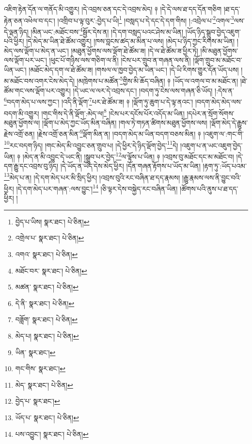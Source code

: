 འཇིག་རྟེན་དོན་ལ་གནོད་མི་འགྱུར། །དེ་འབྲས་ཅན་དང་དེ་འབྲས་མེད། ༈ །དེ་དེ་ལས་ཐ་དད་དོན་གཅིག །ཐ་དད་རྟེན་ཅན་འཕེལ་བ་དང་། །འགྲིབ་པ་ལྟ་བུར་:བྱེད་པ་ཡི།\footnote{བྱེད་པ་ཡིས།  སྣར་ཐང་།  པེ་ཅིན། } །བསླད་པ་དེ་དང་དེ་དག་གིས། །:འབྲེལ་པ་\footnote{འགྲེལ་པ་  སྣར་ཐང་།  པེ་ཅིན། }འགལ་\footnote{འགའ་  སྣར་ཐང་།  པེ་ཅིན། }ལས་དེ་ལྡན་ཉིད། །མིན་ཡང་:མཐོང་བས་\footnote{མཐོང་བར་  སྣར་ཐང་།  པེ་ཅིན། }སྦྱོར་དེས་ན། །དེ་དག་བསླད་པའང་ཤེས་མ་ཡིན། །ཡོད་ཉིད་སྒྲུབ་བྱེད་འཇུག་པའི་ཕྱིར། །དེ་མེད་མ་ཡིན་ཐེ་ཚོམ་འགྱུར། །ཁས་བླངས་ཚད་མ་མིན་པ་ལས། །མེད་པ་ཉིད་ཀྱང་རིགས་མ་ཡིན། །མེད་ལས་ལྡོག་པ་མེད་ན་ཡང་། །མཐུན་ཕྱོགས་ལས་ལྡོག་ཐེ་ཚོམ་ཟ། །དེ་ལ་ཐེ་ཚོམ་ཟ་ཕྱིར་ཏེ། །མི་མཐུན་ཕྱོགས་ལས་ལྡོག་པར་ཡང་། །ཕུང་པོ་གཉིས་ལས་གཅིག་ལ་ནི། །ངེས་པར་གྲུབ་ན་གཞན་ལས་ནི། །ལྡོག་གྲུབ་མ་མཐོང་བ་ཡིན་ཡང་། །མཐོང་མེད་དག་ལ་ཐེ་ཚོམ་ཟ། །གསལ་ལ་ཁྱབ་བྱེད་མ་ཡིན་ཡང་། །དེ་ཡི་རིགས་གྱུར་དོན་ཡོད་པས། །མ་མཐོང་བས་འགར་ངེས་མེད་དེ། །མཁྲེགས་པ་མཚོན་\footnote{མཚན་  སྣར་ཐང་།  པེ་ཅིན། }གྱིས་མི་ཆོད་བཞིན། ༈ །ཡོད་ལ་འགལ་བ་མ་མཐོང་ན། །ཐེ་ཚོམ་གང་ལས་ལྡོག་པར་འགྱུར། །དེ་ཡང་ལ་ལར་དེ་འབྲས་དང་། །བདག་ཏུ་ངེས་ལས་གཞན་ཅི་ཡོད། །:དེས་ན་\footnote{དེ་ནི་  སྣར་ཐང་།  པེ་ཅིན། }བདག་མེད་པ་ལས་ཀྱང་། །འདི་ནི་ལྡོག་\footnote{བཟློག་  སྣར་ཐང་།  པེ་ཅིན། }པར་ཐེ་ཚོམ་ཟ། ༈ །ལྡོག་ཏུ་ཆུག་པ་དེ་ལྟ་ནའང་། །བདག་མེད་མེད་ལས་བདག་མི་འགྱུར། །གང་གིས་དེ་ནི་ལྡོག་:མེད་ལ།\footnote{མེད་པ།  སྣར་ཐང་།  པེ་ཅིན། } །ངེས་པར་དངོས་པོར་འདོད་མ་ཡིན། །དཔེར་ན་སྲོག་སོགས་མཐུན་ཕྱོགས་ལ། །ལྡོག་པ་མེད་ཀྱང་ཡོད་མིན་བཞིན། །གལ་ཏེ་གཏན་ཚིགས་མཐུན་ཕྱོགས་ལས། །ལྡོག་མེད་དེ་རྒྱུས་རྗེས་འགྲོ་ཅན། །རྗེས་འགྲོ་ཅན་མིན་\footnote{ཡིན་  སྣར་ཐང་། }ལྡོག་མིན་ན། །བདག་མེད་མ་ཡིན་བདག་བཅས་མིན། ༈ །འཇུག་ལ་:གང་གི་\footnote{གང་གིས་  སྣར་ཐང་། }རང་བདག་ཉིད། །གང་མེད་མི་འབྱུང་ཅན་གྲུབ་པ། །དེ་ཕྱིར་དེ་ཉིད་ལྡོག་བྱེད་\footnote{མེད་  སྣར་ཐང་།  པེ་ཅིན། }དེ། །འཇུག་པ་ན་ཡང་འཇུག་བྱེད་ཡིན། ༈ །མེད་ན་མི་འབྱུང་དེ་ཡང་ནི། །སྒྲུབ་པར་བྱེད་\footnote{བྱེད་པ་  སྣར་ཐང་། }ལ་ལྟོས་པ་ཡིན། ༈ །འབྲས་བུ་མཐོང་དང་མ་མཐོང་བ། །དེ་དག་རྒྱུ་དང་འབྲས་བུ་ཉིད། །དེ་ཡོད་ན་ཡོད་དེས་མེད་ཕྱིར། །དོན་གཞན་རྟོགས་པ་ཡོད་མ་ཡིན། །རྟག་ཏུ་:ཡོད་པའམ་\footnote{ཡོད་པ་  སྣར་ཐང་།  པེ་ཅིན། }མེད་པ་ན། །དེ་དག་མེད་པར་མི་སྲིད་ཕྱིར། །འབྲས་བུའི་རང་བཞིན་ཐ་དད་རྣམས། །རྒྱུ་རྣམས་ལས་ནི་བྱུང་བའི་ཕྱིར། །དེ་དག་མེད་པར་གཞན་:ལས་བྱུང་།\footnote{པས་འབྱུང་།  སྣར་ཐང་།  པེ་ཅིན། } །ཅི་ལྟར་དེས་བསྐྱེད་རང་བཞིན་ཡིན། །ཚོགས་པའི་ནུས་པ་ཐ་དད་ཕྱིར། །
